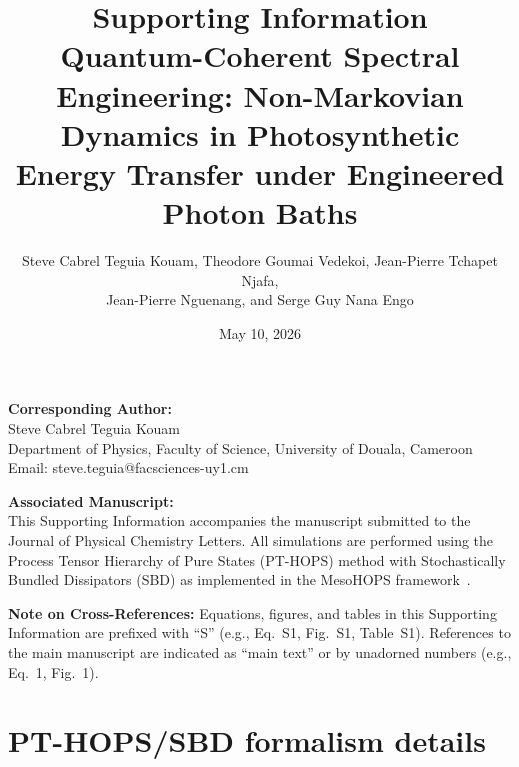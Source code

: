 \documentclass[11pt,a4paper]{article}
\begin{document}
\title{\textbf{Supporting Information}\\[0.5em]
\large Quantum-Coherent Spectral Engineering: Non-Markovian Dynamics in Photosynthetic Energy Transfer under Engineered Photon Baths}

\author{Steve Cabrel Teguia Kouam, Theodore Goumai Vedekoi, Jean-Pierre Tchapet Njafa,\\ Jean-Pierre Nguenang, and Serge Guy Nana Engo}

\date{May 10, 2026}

\maketitle

\noindent\textbf{Corresponding Author:}\\
Steve Cabrel Teguia Kouam\\
Department of Physics, Faculty of Science, University of Douala, Cameroon\\
Email: steve.teguia@facsciences-uy1.cm

\vspace{1em}
\noindent\textbf{Associated Manuscript:}\\
This Supporting Information accompanies the manuscript submitted to the Journal of Physical Chemistry Letters. All simulations are performed using the Process Tensor Hierarchy of Pure States (PT-HOPS) method with Stochastically Bundled Dissipators (SBD) as implemented in the MesoHOPS framework~\cite{Varvelo2021a,Citty2024a}.

\tableofcontents

\newpage

\noindent\textbf{Note on Cross-References:} Equations, figures, and tables in this Supporting Information are prefixed with ``S'' (e.g., Eq.~S1, Fig.~S1, Table~S1). References to the main manuscript are indicated as ``main text'' or by unadorned numbers (e.g., Eq.~1, Fig.~1).

\vspace{1em}


\section{PT-HOPS/SBD formalism details}
\label{sec:formalism}
\end{document}
